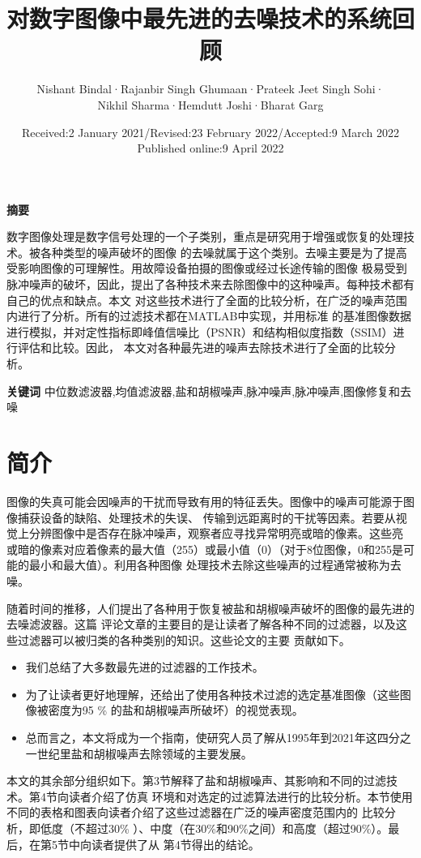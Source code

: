 \documentclass{article} %
\title{对数字图像中最先进的去噪技术的系统回顾}  %
\author{Nishant Bindal·Rajanbir Singh Ghumaan·Prateek Jeet Singh Sohi·
 \\Nikhil Sharma·Hemdutt Joshi·Bharat Garg}%
\date{Received:2 January 2021/Revised:23 February 2022/Accepted:9 March 2022
\\Published online:9 April 2022}       %
\begin{document}
\maketitle          %

\textbf{摘要}

数字图像处理是数字信号处理的一个子类别，重点是研究用于增强或恢复的处理技术。被各种类型的噪声破坏的图像
的去噪就属于这个类别。去噪主要是为了提高受影响图像的可理解性。用故障设备拍摄的图像或经过长途传输的图像
极易受到脉冲噪声的破坏，因此，提出了各种技术来去除图像中的这种噪声。每种技术都有自己的优点和缺点。本文
对这些技术进行了全面的比较分析，在广泛的噪声范围内进行了分析。所有的过滤技术都在MATLAB中实现，并用标准
的基准图像数据进行模拟，并对定性指标即峰值信噪比（PSNR）和结构相似度指数（SSIM）进行评估和比较。因此，
本文对各种最先进的噪声去除技术进行了全面的比较分析。
\bigskip

\textbf{关键词}
\quad 中位数滤波器,均值滤波器,盐和胡椒噪声,脉冲噪声,脉冲噪声,图像修复和去噪

\section{简介}
图像的失真可能会因噪声的干扰而导致有用的特征丢失。图像中的噪声可能源于图像捕获设备的缺陷、处理技术的失误、
传输到远距离时的干扰等因素。若要从视觉上分辨图像中是否存在脉冲噪声，观察者应寻找异常明亮或暗的像素。这些亮
或暗的像素对应着像素的最大值（255）或最小值（0）（对于8位图像，0和255是可能的最小和最大值）。利用各种图像
处理技术去除这些噪声的过程通常被称为去噪。\par

\hspace{2em}随着时间的推移，人们提出了各种用于恢复被盐和胡椒噪声破坏的图像的最先进的去噪滤波器。这篇
评论文章的主要目的是让读者了解各种不同的过滤器，以及这些过滤器可以被归类的各种类别的知识。这些论文的主要
贡献如下。

\begin{itemize}
\item 我们总结了大多数最先进的过滤器的工作技术。
\item 为了让读者更好地理解，还给出了使用各种技术过滤的选定基准图像（这些图像被密度为95 \% 的盐和胡椒噪声所破坏）的视觉表现。
\item 总而言之，本文将成为一个指南，使研究人员了解从1995年到2021年这四分之一世纪里盐和胡椒噪声去除领域的主要发展。
\end{itemize}

\hspace{2em}本文的其余部分组织如下。第3节解释了盐和胡椒噪声、其影响和不同的过滤技术。第4节向读者介绍了仿真
环境和对选定的过滤算法进行的比较分析。本节使用不同的表格和图表向读者介绍了这些过滤器在广泛的噪声密度范围内的
比较分析，即低度（不超过30\% ）、中度（在30\%和90\%之间）和高度（超过90\%）。最后，在第5节中向读者提供了从
第4节得出的结论。
\end{document}
